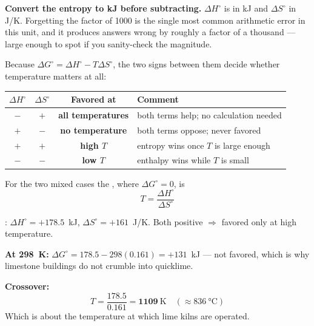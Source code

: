 \documentclass{apchem-notes}
\begin{document}
\begin{apctrap}
\textbf{Convert the entropy to kJ before subtracting.} $\Delta H^\circ$ is
in kJ and $\Delta S^\circ$ in J/K. Forgetting the factor of 1000 is the
single most common arithmetic error in this unit, and it produces answers
wrong by roughly a factor of a thousand --- large enough to spot if you
sanity-check the magnitude.
\end{apctrap}



Because $\Delta G^\circ = \Delta H^\circ - T\Delta S^\circ$, the two signs
between them decide whether temperature matters at all:

\begin{center}
\renewcommand{\arraystretch}{1.2}
\begin{tabular}{@{}cccl@{}}
\hline
$\Delta H^\circ$ & $\Delta S^\circ$ & \textbf{Favored at} &
  \textbf{Comment} \\
\hline
$-$ & $+$ & \textbf{all temperatures} & both terms help; no calculation
  needed \\
$+$ & $-$ & \textbf{no temperature} & both terms oppose; never favored \\
$+$ & $+$ & \textbf{high $T$} & entropy wins once $T$ is large enough \\
$-$ & $-$ & \textbf{low $T$} & enthalpy wins while $T$ is small \\
\hline
\end{tabular}
\end{center}

For the two mixed cases the , where
$\Delta G^\circ = 0$, is
\[ T = \frac{\Delta H^\circ}{\Delta S^\circ} \]

\begin{workedexample}
: $\Delta H^\circ = +178.5$~kJ,
$\Delta S^\circ = +161$~J/K. Both positive $\Rightarrow$ favored only at
high temperature.

\textbf{At \SI{298}{\kelvin}:}
$\Delta G^\circ = 178.5 - 298(0.161) = +131$~kJ --- not favored, which is
why limestone buildings do not crumble into quicklime.

\textbf{Crossover:}
\[ T = \frac{178.5}{0.161} = \mathbf{1109}~\si{\kelvin}
   \quad (\approx \SI{836}{\celsius}) \]
Which is about the temperature at which lime kilns are operated.
\end{workedexample}
\end{document}
